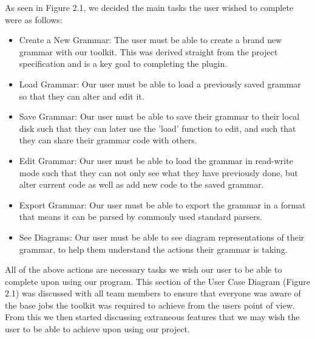 As seen in Figure 2.1, we decided the main tasks the user wished to complete were as follows:
\begin {itemize}
	\item Create a New Grammar: The user must be able to create a brand new grammar with our toolkit. This was derived straight from the project specification and is a key goal to completing the plugin.
	\item Load Grammar: Our user must be able to load a previously saved grammar so that they can alter and edit it.
	\item Save Grammar: Our user must be able to save their grammar to their local disk such that they can later use the 'load' function to edit, and such that they can share their grammar code with others.
	\item Edit Grammar: Our user must be able to load the grammar in read-write mode such that they can not only see what they have previously done, but alter current code as well as add new code to the saved grammar. 
	\item Export Grammar: Our user must be able to export the grammar in a format that means it can be parsed by commonly used standard parsers.
	\item See Diagrams: Our user must be able to see diagram representations of their grammar, to help them understand the actions their grammar is taking. 
\end{itemize}
All of the above actions are necessary tasks we wish our user to be able to complete upon using our program. This section of the User Case Diagram (Figure 2.1) was discussed with all team members to ensure that everyone was aware of the base jobs the toolkit was required to achieve from the users point of view.  From this we then started discussing extraneous features that we may wish the user to be able to achieve upon using our project. 

